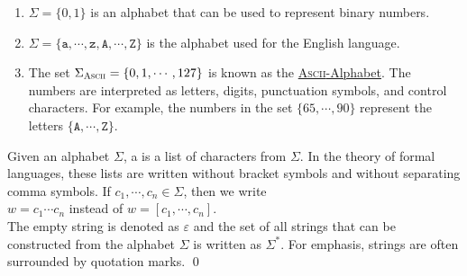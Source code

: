 \examplesEng
\begin{enumerate}
\item $\Sigma = \{ 0, 1\}$ is an alphabet that can be used to represent binary numbers.
\item $\Sigma = \{ \mathtt{a}, \cdots, \mathtt{z}, \mathtt{A}, \cdots, \mathtt{Z} \}$ 
      is the alphabet used for the English language.
\item The set $\Sigma_{\textsc{\scriptsize Ascii}} = \{ 0, 1, \cdots, 127 \}$ is known as the
      \href{http://en.wikipedia.org/wiki/ASCII}{\textsc{Ascii}-Alphabet}.  The numbers are
      interpreted as letters, digits, punctuation symbols, and control characters.
      For example, the numbers in the set $\{65, \cdots, 90 \}$ represent the letters
      $\{\mathtt{A}, \cdots, \mathtt{Z}\}$.  
      \eox
\end{enumerate}

\begin{Definition}[Strings]
Given an alphabet $\Sigma$, a   is a list of characters from $\Sigma$.
In the theory of formal languages, these lists are written without bracket symbols and without
separating comma symbols.  If $c_1,\cdots,c_n \in \Sigma$, then we write 
\\[0.2cm]
\hspace*{1.3cm}
$w = c_1\cdots c_n$ \quad instead of \quad $w = [c_1,\cdots,c_n]$.
\\[0.2cm]
The empty string is denoted as $\varepsilon$ and  the set of all strings that can be constructed
from the alphabet $\Sigma$ is written as $\Sigma^*$. \index{$\Sigma^*$} For emphasis, strings are often
surrounded by quotation marks. \qed
\end{Definition}

